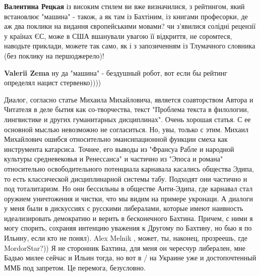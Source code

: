 \begin{itemize}
\begin{itemize}
\textbf{Валентина Рецкая} із високим стилем ви вже визначилися, з рейтингом, який встановлює "машина" - також, а як там із Бахтіним, із книгами професорки, де аж два поклики на видання європейськими мовами? чи з'явилися солідні рецензії у країнах ЄС, може в США вшанували увагою її відкриття, не соромтеся, наводьте приклади, можете так само, як і з запозиченням із Тлумачного словника (без поклику на першоджерело)!

 
\textbf{Valerii Zema} ну да "машина" - бездушный робот, вот если бы рейтинг определял нацист стервенко))))

 

Диалог, согласно статье Михаила Михайловича, является соавторством Автора и
Читателя в деле бытия как со-творчества, текст "Проблема текста в филологии,
лингвистике и других гуманитарных дисциплинах". Очень хорошая статья. С ее
основной мыслью невозможно не согласиться. Но, увы, только с этим. Михаил
Михайлович ошибся относительно эмансипационной функции смеха как инструмента
катарсиса. Точнее, его выводы из "Франсуа Рабле и народной культуры
средневековья и Ренессанса" и частично из "Эпоса и романа" относительно
освободительного потенциала карнавала касались общества Эдипа, то есть
классической дисциплинарной системы табу. Подходят они частично и под
тоталитаризм. Но они бессильны в обществе Анти-Эдипа, где карнавал стал оружием
уничтожения и чистки, что мы видим на примере укронаци. А диалоги у меня были в
дискуссиях с русскими либералами, которые имеют наивность идеализировать
демократию и верить в бесконечного Бахтина. Причем, с ними я могу спорить,
сохраняя интенцию уважения к Другому по Бахтину, но бью я по Ильину, если кто
не понял). Alex Melnik , может, ты, наконец, прозреешь, где MordorStar?)) Я не
сторонник Бахтина, для меня он чересчур либерален, мне Бадью милее сейчас и
Ильин тогда, но вот в / на Украине уже и достопочтенный ММБ под запретом. Це
перемога, безусловно.


 

\end{itemize}
\end{itemize}
